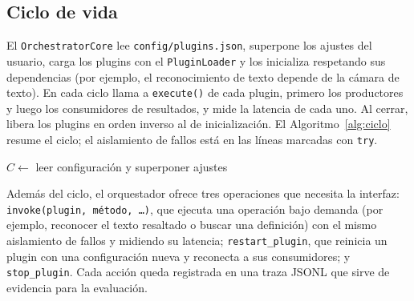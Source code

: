 \subsection{Ciclo de vida}

El \texttt{OrchestratorCore} lee \texttt{config/plugins.json}, superpone los ajustes del usuario, carga los plugins con el \texttt{PluginLoader} y los inicializa respetando sus dependencias (por ejemplo, el reconocimiento de texto depende de la cámara de texto). En cada ciclo llama a \texttt{execute()} de cada plugin, primero los productores y luego los consumidores de resultados, y mide la latencia de cada uno. Al cerrar, libera los plugins en orden inverso al de inicialización. El Algoritmo~\ref{alg:ciclo} resume el ciclo; el aislamiento de fallos está en las líneas marcadas con \texttt{try}.

\begin{algorithm}[H]
\caption{Ciclo de vida del orquestador.}
\label{alg:ciclo}
$C \leftarrow$ leer configuración y superponer ajustes\;
\end{algorithm}

Además del ciclo, el orquestador ofrece tres operaciones que necesita la interfaz: \texttt{invoke(plugin, método, …)}, que ejecuta una operación bajo demanda (por ejemplo, reconocer el texto resaltado o buscar una definición) con el mismo aislamiento de fallos y midiendo su latencia; \texttt{restart\_plugin}, que reinicia un plugin con una configuración nueva y reconecta a sus consumidores; y \texttt{stop\_plugin}. Cada acción queda registrada en una traza JSONL que sirve de evidencia para la evaluación.

